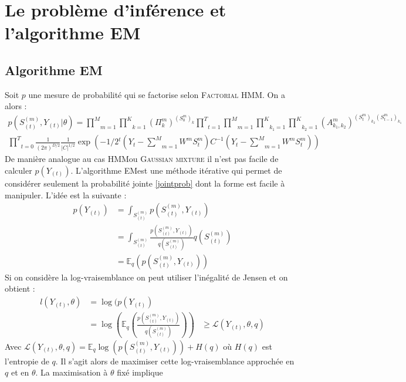 \documentclass[10pt,a4paper]{article}
\newcommand{\hmm}{\textsc{HMM}}
\newcommand{\fhmm}{\textsc{Factorial HMM}}
\newcommand{\EM}{\textsc{EM}}
\begin{document}
\section{Le problème d'inférence et l'algorithme EM}
\subsection{Algorithme EM}
Soit $p$ une mesure de probabilité qui se factorise selon \fhmm. On a alors :
\begin{multline}
p(S_{(t)}^{(m)},Y_{(t)} \vert \theta)=\underset{m=1}{\overset{M}{\prod}}\underset{k=1}{\overset{K}{\prod}}(\Pi_k^m)^{(S_0^m)_k}\underset{t=1}{\overset{T}{\prod}}\underset{m=1}{\overset{M}{\prod}}\underset{k_1=1}{\overset{K}{\prod}}\underset{k_2=1}{\overset{K}{\prod}}(A_{k_1,k_2}^m)^{(S_t^m)_{k_2}(S_{t-1}^m)_{k_1}}\\ \underset{t=0}{\overset{T}{\prod}}\frac{1}{(2\pi)^{D/2}}\frac{1}{\vert C  \vert^{1/2}}\exp\left(-1/2 {}^t\left(Y_t- \underset{m=1}{\overset{M}{\sum}}W^m S_t^m \right)C^{-1} \left(Y_t- \underset{m=1}{\overset{M}{\sum}}W^m S_t^m \right)\right) \label{jointprob}
\end{multline}
De manière analogue au cas \hmm ou \textsc{Gaussian mixture} il n'est pas facile de calculer $p(Y_{(t)})$. L'algorithme \EM est une méthode itérative qui permet de considérer seulement la probabilité jointe \ref{jointprob} dont la forme est facile à manipuler. L'idée est la suivante :
\begin{equation}
\begin{aligned}
p(Y_{(t)})&=\int_{S_{(t)}^{(m)}}p(S_{(t)}^{(m)},Y_{(t)}) \\
&=\int_{S_{(t)}^{(m)}}\frac{p(S_{(t)}^{(m)},Y_{(t)})}{q(S_{(t)}^{(m)})}q(S_{(t)}^{(m)}) \\
&=\mathbb{E}_q\left(p(S_{(t)}^{(m)},Y_{(t)}) \right)
\end{aligned}
\end{equation}
Si on considère la log-vraisemblance on peut utiliser l'inégalité de Jensen et on obtient :
\begin{equation}
\begin{aligned}
l(Y_{(t)},\theta)&=\log(p(Y_{(t)}) \\
&=\log\left( \mathbb{E}_q\left( \frac{p(S_{(t)}^{(m)},Y_{(t)})}{q(S_{(t)}^{(m)})} \right) \right)
&\ge \mathcal{L}(Y_{(t)},\theta,q)
\end{aligned}
\end{equation}
Avec $\mathcal{L}(Y_{(t)},\theta,q)=\mathbb{E}_q \log \left( p(S_{(t)}^{(m)}, Y_{(t)})\right)+H(q)$ où $H(q)$ est l'entropie de $q$. Il s'agit alors de maximiser cette log-vraisemblance approchée en $q$ et en $\theta$. La maximisation à $\theta$ fixé implique 
\end{document}
